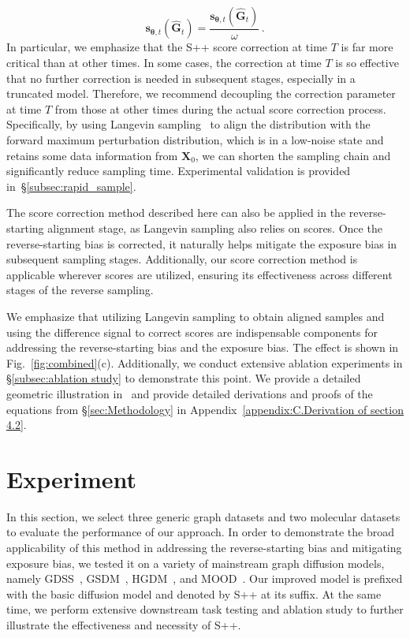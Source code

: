 \documentclass{article}
\newcommand{\s}{{{\bm s}}}
\newcommand{\X}{{{\bm X}}}
\newcommand{\G}{{{\bm G}}}
\newcommand{\THETA}{{\bm\theta}}
\begin{document}
\begin{equation}
\s_{\THETA,t}(\hat{\G}_t) 
=\frac{\s_{\THETA,t}(\hat{\G}_t)}{\omega}\,.
\label{eq:magnitude_score_diff}
\end{equation}
In particular, we emphasize that the S++ score correction at time $T$ is far more critical than at other times. In some cases, the correction at time $T$ is so effective that no further correction is needed in subsequent stages, especially in a truncated model. Therefore, we recommend decoupling the correction parameter at time $T$ from those at other times during the actual score correction process. Specifically, by using Langevin sampling~\citep{song2019generative} to align the distribution with the forward maximum perturbation distribution, which is in a low-noise state and retains some data information from $\X_0$, we can shorten the sampling chain and significantly reduce sampling time. Experimental validation is provided in~\S\ref{subsec:rapid_sample}.

The score correction method described here can also be applied in the reverse-starting alignment stage, as Langevin sampling also relies on scores. Once the reverse-starting bias is corrected, it naturally helps mitigate the exposure bias in subsequent sampling stages. Additionally, our score correction method is applicable wherever scores are utilized, ensuring its effectiveness across different stages of the reverse sampling.

We emphasize that utilizing Langevin sampling to obtain aligned samples and using the difference signal to correct scores are indispensable components for addressing the reverse-starting bias and the exposure bias. The effect is shown in Fig.~\ref{fig:combined}(c). Additionally, we conduct extensive ablation experiments in \S\ref{subsec:ablation study} to demonstrate this point. We provide a detailed geometric illustration in~ and provide detailed derivations and proofs of the equations from \S\ref{sec:Methodology} in Appendix~\ref{appendix:C.Derivation of section 4.2}.
\section{Experiment}\label{sec:5.EXPERIMENTS}
In this section, we select three generic graph datasets and two molecular datasets to evaluate the performance of our approach. In order to demonstrate the broad applicability of this method in addressing the reverse-starting bias and mitigating exposure bias, we tested it on a variety of mainstream graph diffusion models, namely GDSS~\citep{jo2022GDSS}, GSDM~\citep{luo2023fast}, HGDM~\citep{wen2024hyperbolic}, and MOOD~\citep{lee2023exploring}. Our improved model is prefixed with the basic diffusion model and denoted by S++ at its suffix. At the same time, we perform extensive downstream task testing and ablation study to further illustrate the effectiveness and necessity of S++.
\end{document}
